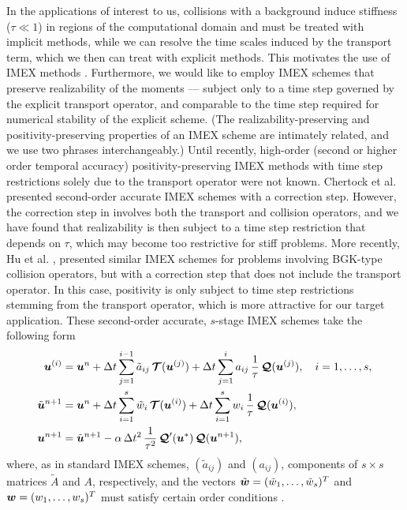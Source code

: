 In the applications of interest to us, collisions with a background induce stiffness ($\tau\ll1$) in regions of the computational domain and must be treated with implicit methods, while we can resolve the time scales induced by the transport term, which we then can treat with explicit methods.  
This motivates the use of IMEX methods \cite{ascher_etal_1997,pareschiRusso_2005}.  
Furthermore, we would like to employ IMEX schemes that preserve realizability of the moments --- subject only to a time step governed by the explicit transport operator, and comparable to the time step required for numerical stability of the explicit scheme.  
(The realizability-preserving and positivity-preserving properties of an IMEX scheme are intimately related, and we use two phrases interchangeably.)  
Until recently, high-order (second or higher order temporal accuracy) positivity-preserving IMEX methods with time step restrictions solely due to the transport operator were not known.  
Chertock et al. \cite{chertock_etal_2015} presented second-order accurate IMEX schemes with a correction step.  
However, the correction step in \cite{chertock_etal_2015} involves both the transport and collision operators, and we have found that realizability is then subject to a time step restriction that depends on $\tau$, which may become too restrictive for stiff problems.  
More recently, Hu et al. \cite{hu_etal_2018}, presented similar IMEX schemes for problems involving BGK-type collision operators, but with a correction step that does not include the transport operator.  
In this case, positivity is only subject to time step restrictions stemming from the transport operator, which is more attractive for our target application.  
These second-order accurate, $s$-stage IMEX schemes take the following form \cite{hu_etal_2018}
\begin{align}
  \boldsymbol{u}^{(i)}
  &=\boldsymbol{u}^{n}
  +\Delta t\sum_{j=1}^{i-1}\tilde{a}_{ij}\,\boldsymbol{\mathcal{T}}(\boldsymbol{u}^{(j)})
  +\Delta t\sum_{j=1}^{i}a_{ij}\,\frac{1}{\tau}\,\boldsymbol{\mathcal{Q}}(\boldsymbol{u}^{(j)}),
  \quad i=1,\ldots,s, \label{imexStages} \\
  \tilde{\boldsymbol{u}}^{n+1}
  &=\boldsymbol{u}^{n}
  +\Delta t\sum_{i=1}^{s}\tilde{w}_{i}\,\boldsymbol{\mathcal{T}}(\boldsymbol{u}^{(i)})
  +\Delta t\sum_{i=1}^{s}w_{i}\,\frac{1}{\tau}\,\boldsymbol{\mathcal{Q}}(\boldsymbol{u}^{(i)}), \label{imexIntermediate} \\
  \boldsymbol{u}^{n+1}
  &=\tilde{\boldsymbol{u}}^{n+1}-\alpha\,\Delta t^{2}\,\frac{1}{\tau^{2}}\,\boldsymbol{\mathcal{Q}}'(\boldsymbol{u}^{*})\,\boldsymbol{\mathcal{Q}}(\boldsymbol{u}^{n+1}), \label{eq:imexCorrection}
\end{align}
where, as in standard IMEX schemes, $(\tilde{a}_{ij})$ and $(a_{ij})$, components of $s\times s$ matrices $\tilde{A}$ and $A$, respectively, and the vectors $\tilde{\boldsymbol{w}}=(\tilde{w}_{1},\ldots,\tilde{w}_{s})^{T}$ and $\boldsymbol{w}=(w_{1},\ldots,w_{s})^{T}$ must satisfy certain order conditions \cite{pareschiRusso_2005}.  
